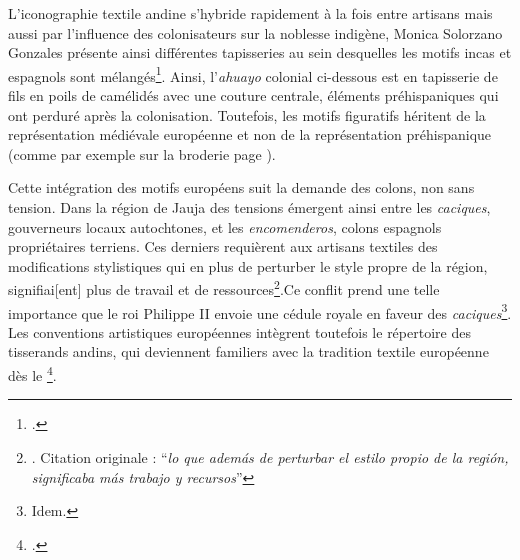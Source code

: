 L'iconographie textile andine s'hybride rapidement à la fois entre artisans mais aussi par l'influence des colonisateurs sur la noblesse indigène, Monica Solorzano Gonzales présente ainsi différentes tapisseries au sein desquelles les motifs incas et espagnols sont mélangés\footcite[p.~499-500]{solorzanogonzalesTapizAndinoNobleza2020}. Ainsi, l'\textit{ahuayo} colonial ci-dessous est en tapisserie de fils en poils de camélidés avec une couture centrale, éléments préhispaniques qui ont perduré après la colonisation. Toutefois, les motifs figuratifs héritent de la représentation médiévale européenne et non de la représentation préhispanique (comme par exemple sur la broderie page \pageref{fig:VAM005}).

Cette intégration des motifs européens suit la demande des colons, non sans tension. Dans la région de Jauja des tensions émergent ainsi entre les \textit{caciques}, gouverneurs locaux autochtones, et les \textit{encomenderos}, colons espagnols propriétaires terriens. Ces derniers requièrent aux artisans textiles des modifications stylistiques qui \og en plus de perturber le style propre de la région, signifiai[ent] plus de travail et de ressources\footnote{\cite[p.~124]{ramosTejidosSociedadColonial2010}. Citation originale : \textquotedblleft \textit{lo que además de perturbar el estilo propio de la región, significaba más trabajo y recursos}\textquotedblright}.\fg \:Ce conflit prend une telle importance que le roi Philippe II envoie une cédule royale en faveur des \textit{caciques}\footnote{Idem.}. Les conventions artistiques européennes intègrent toutefois le répertoire des tisserands andins, qui deviennent familiers avec la tradition textile européenne dès le \footcite[p.~60]{nilesArtistEmpireInca1994}. \\

